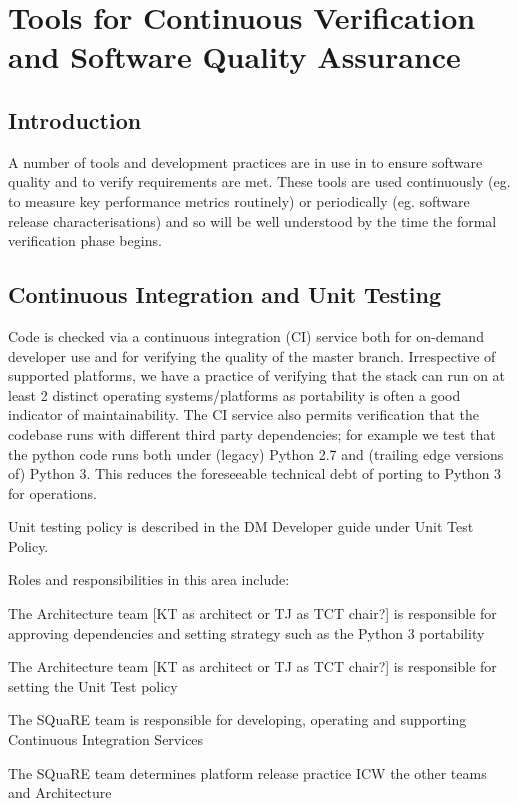 \section{Tools for Continuous Verification and Software Quality Assurance}

\subsection{Introduction}

A number of tools and development practices are in use in \product to ensure software quality and to verify requirements are met. These tools are used continuously (eg. to measure key performance metrics routinely) or periodically (eg. software release characterisations) and so will be well understood by the time the formal verification phase begins. 

\subsection{Continuous Integration and Unit Testing}
 
Code is checked via a continuous integration (CI) service both for on-demand developer use and for verifying the quality of the master branch. Irrespective of supported platforms, we have a practice of verifying that the stack can run on at least 2 distinct operating systems/platforms as portability is often a good indicator of maintainability. The CI service also permits verification that the codebase runs with different third party dependencies; for example we test that the python code runs both under (legacy) Python 2.7 and (trailing edge versions of) Python 3. This reduces the foreseeable technical debt of porting to Python 3 for operations.
 
Unit testing policy is described in the DM Developer guide under Unit Test Policy.
 
Roles and responsibilities in this area include:

\begin{itemize_single}
  
\item The Architecture team [KT as architect or TJ as TCT chair?] is responsible for approving dependencies and setting strategy such as the Python 3 portability

\item The Architecture team [KT as architect or TJ as TCT chair?] is responsible for setting the Unit Test policy

\item The SQuaRE team is responsible for developing, operating and supporting Continuous Integration Services

\item The SQuaRE team determines platform release practice ICW the other teams and Architecture
  
\end{itemize_single}

